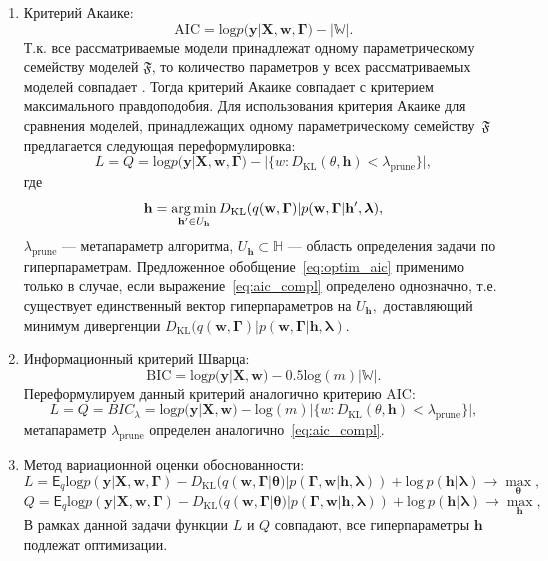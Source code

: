\begin{enumerate}
\item Критерий Акаике:
\[
   \text{AIC} =  \text{log}p(\mathbf{y}|\mathbf{X}, \mathbf{w}, \boldsymbol{\Gamma})-|\mathbb{W}|.
\]
Т.к. все рассматриваемые модели принадлежат одному параметрическому семейству моделей $\mathfrak{F}$, то количество параметров у всех рассматриваемых моделей  совпадает . Тогда критерий Акаике совпадает с критерием максимального правдоподобия. Для использования критерия Акаике для сравнения моделей, принадлежащих одному параметрическому семейству~$\mathfrak{F}$ предлагается следующая переформулировка:
\begin{equation}
\label{eq:optim_aic}
    L = Q = \text{log}p(\mathbf{y}|\mathbf{X}, \mathbf{w}, \boldsymbol{\Gamma})
-|\{w: D_\text{KL}(\theta, \mathbf{h})<\lambda_{\text{prune}}\}|,
\end{equation}
где 
\begin{equation}\label{eq:aic_compl}\mathbf{h}=\operatorname*{arg\,min}_{\mathbf{h}'\in U_\mathbf{h}}D_\text{KL}(q(\mathbf{w},\boldsymbol{\Gamma})| p(\mathbf{w},\boldsymbol{\Gamma}|\mathbf{h}',\boldsymbol{\lambda}),\end{equation} $\lambda_{\text{prune}}$ --- метапараметр алгоритма, $U_\mathbf{h}  \subset \mathbb{H}$ --- область определения задачи по гиперпараметрам. Предложенное обобщение~\eqref{eq:optim_aic} применимо только в случае, если выражение~\eqref{eq:aic_compl} определено однозначно, т.е. существует единственный вектор гиперпараметров на $U_\mathbf{h},$ доставляющий минимум дивергенции $D_\text{KL}(q(\mathbf{w},\boldsymbol{\Gamma})| p(\mathbf{w},\boldsymbol{\Gamma}|\mathbf{h},\boldsymbol{\lambda}).$

\item Информационный критерий Шварца:
\[
    \text{BIC} = \text{log}p(\mathbf{y}|\mathbf{X}, \mathbf{w})-0.5\text{log}(m)|\mathbb{W}|.
\]
Переформулируем данный критерий аналогично критерию AIC:
\begin{equation}
\label{eq:optim_bic}
    L = Q = BIC_{\lambda} = \text{log}p(\mathbf{y}|\mathbf{X}, \mathbf{w}) - \text{log}(m)|\{w: D_\text{KL}(\theta, \mathbf{h})<\lambda_{\text{prune}}\}|,
\end{equation}
метапараметр $\lambda_{\text{prune}}$ определен аналогично~\eqref{eq:aic_compl}.

\item Метод вариационной оценки обоснованности:
\begin{equation}
\label{eq:optim_elbo_method}   
    L = \mathsf{E}_q \text{log}p(\mathbf{y}|\mathbf{X}, \mathbf{w}, \boldsymbol{\Gamma})-D_\text{KL}(q(\mathbf{w}, \boldsymbol{\Gamma}|\boldsymbol{\theta})|p(\boldsymbol{\Gamma}, \mathbf{w}|\mathbf{h},\boldsymbol{\lambda}))  + \text{log}~p(\mathbf{h}|\boldsymbol{\lambda}) \to \max_{\boldsymbol{\theta}},
\end{equation}
\[
    Q = \mathsf{E}_q \text{log}p(\mathbf{y}|\mathbf{X}, \mathbf{w}, \boldsymbol{\Gamma})-D_\text{KL}(q(\mathbf{w}, \boldsymbol{\Gamma}|\boldsymbol{\theta})|p(\boldsymbol{\Gamma}, \mathbf{w}|\mathbf{h},\boldsymbol{\lambda}))  + \text{log}~p(\mathbf{h}|\boldsymbol{\lambda}) \to \max_{\mathbf{h}},
\]
В рамках данной задачи функции $L$ и $Q$ совпадают, все гиперпараметры $\mathbf{h}$ подлежат оптимизации.


\end{enumerate}
